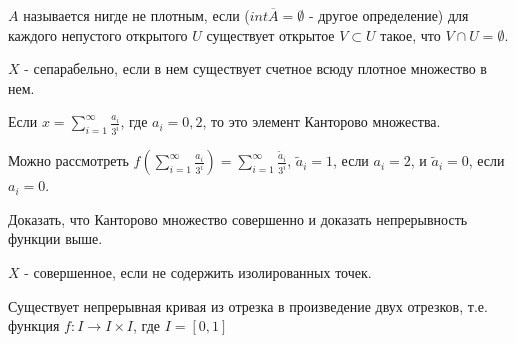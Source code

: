 \begin{definition}
    $A$ называется нигде не плотным, если ($int \overline{A} = \emptyset$ - другое определение) для каждого непустого открытого $U$ существует открытое $V \subset U$ такое, что $V \cap U = \emptyset$.
\end{definition}

\begin{definition}
    $X$ - сепарабельно, если в нем существует счетное всюду плотное множество в нем.
\end{definition}

\begin{example}
    Если $x = \sum_{i = 1}^{\infty} \frac{a_i}{3^i}$, где $a_i = 0, 2$, то это элемент Канторово множества.

    Можно рассмотреть $f(\sum_{i = 1}^{\infty} \frac{a_i}{3^i}) = \sum_{i = 1}^{\infty} \frac{\widetilde{a}_i}{3^i}$, $\widetilde{a}_i = 1$, если $a_i = 2$, и $\widetilde{a}_i = 0$, если $a_i = 0$.
\end{example}

\begin{exercise}
    Доказать, что Канторово множество совершенно и доказать непрерывность функции выше.
\end{exercise}

\begin{definition}
    $X$ - совершенное, если не содержить изолированных точек.
\end{definition}

\begin{theorem}
    Существует непрерывная кривая из отрезка в произведение двух отрезков, т.е. функция $f: I \rightarrow I \times I$, где $I = [0, 1]$
\end{theorem}
